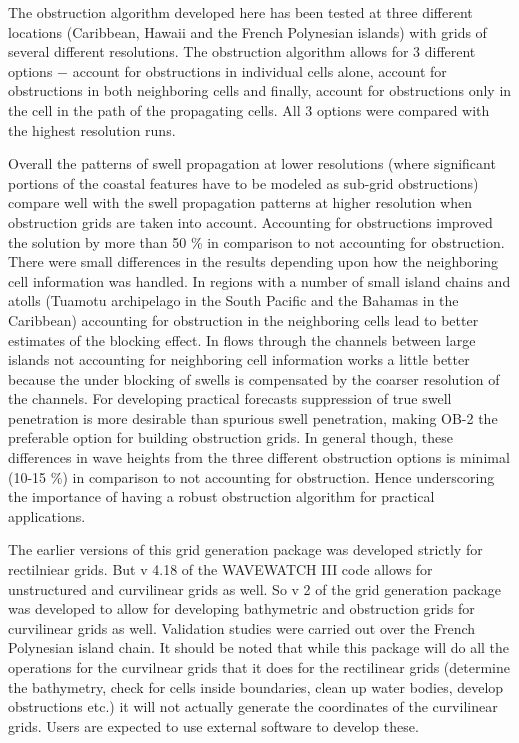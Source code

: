 \documentclass[12pt]{article}
\begin{document}
The obstruction algorithm developed here has been tested at three different locations (Caribbean, Hawaii and the French Polynesian islands) with grids of several different resolutions. The obstruction algorithm allows for 3 different options $-$ account for obstructions in individual cells alone, account for obstructions in both neighboring cells and finally, account for obstructions only in the cell in the path of the propagating cells. All 3 options were compared with the highest resolution runs. 

Overall the patterns of swell propagation at lower resolutions (where significant portions of the coastal features have to be modeled as sub-grid obstructions) compare well with the swell propagation patterns at higher resolution when obstruction grids are taken into account. Accounting for obstructions improved the solution by more than 50 \% in comparison to not accounting for obstruction. There were small differences in the results depending upon how the neighboring cell information was handled. In regions with a number of small island chains and atolls (Tuamotu archipelago in the South Pacific and the Bahamas in the Caribbean) accounting for obstruction in the neighboring cells lead to better estimates of the blocking effect. In flows through the channels between large islands not accounting for neighboring cell information works a little better because the under blocking of swells is compensated by the coarser resolution of the channels. For developing practical forecasts suppression of true swell penetration is more desirable than spurious swell penetration, making OB-2 the preferable option for building obstruction grids. In general though, these differences in wave heights from the three different obstruction options is minimal (10-15 \%) in comparison to not accounting for obstruction. Hence underscoring the importance of having a robust obstruction algorithm for practical applications.    

The earlier versions of this grid generation package was developed strictly for rectilniear grids. But v 4.18 of the WAVEWATCH III code allows for unstructured and curvilinear grids as well. So v 2 of the grid generation package was developed to allow for developing bathymetric and obstruction grids for curvilinear grids as well. Validation studies were carried out over the French Polynesian island chain. It should be noted that while this package will do all the operations for the curvilnear grids that it does for the rectilinear grids (determine the bathymetry, check for cells inside boundaries, clean up water bodies, develop obstructions etc.) it will not actually generate the coordinates of the curvilinear grids. Users are expected to use external software to develop these. 
\end{document}

